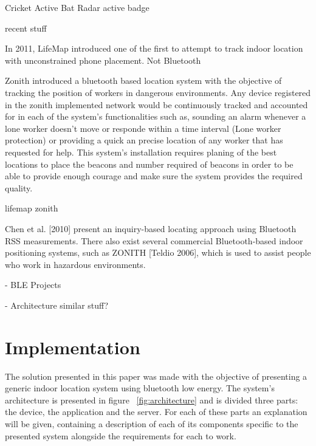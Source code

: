 \documentclass[a4paper]{IEEEtran}
\begin{document}
Cricket
Active Bat
Radar
active badge

recent stuff

In 2011, LifeMap \cite{lifemap} introduced one of the first to attempt to track indoor location with unconstrained phone placement. Not Bluetooth

Zonith \cite{zonith} introduced a bluetooth based location system with the objective of tracking the position of workers in dangerous environments. Any device registered in the zonith implemented network would be continuously tracked and accounted for in each of the system's functionalities such as, sounding an alarm whenever a lone worker doesn't move or responde within a time interval (Lone worker protection) or providing a quick an precise location of any worker that has requested for help. This system's installation requires planing of the best locations to place the beacons and number required of beacons in order to be able to provide enough courage and make sure the system provides the required quality.

lifemap
zonith


Chen et al. [2010] present an inquiry-based locating approach using Bluetooth
RSS measurements. There also exist several commercial Bluetooth-based indoor positioning
systems, such as ZONITH [Teldio 2006], which is used to assist people who
work in hazardous environments.


- BLE Projects
	

- Architecture similar stuff?

\section{Implementation}
\label{sec:struture}


The solution presented in this paper was made with the objective of presenting a generic indoor location system using bluetooth low energy. The system's architecture is presented in figure ~\ref{fig:architecture} and is divided three parts: the device, the application and the server. For each of these parts an explanation will be given, containing a description of each of its components specific to the presented system alongside the requirements for each to work.
\end{document}
